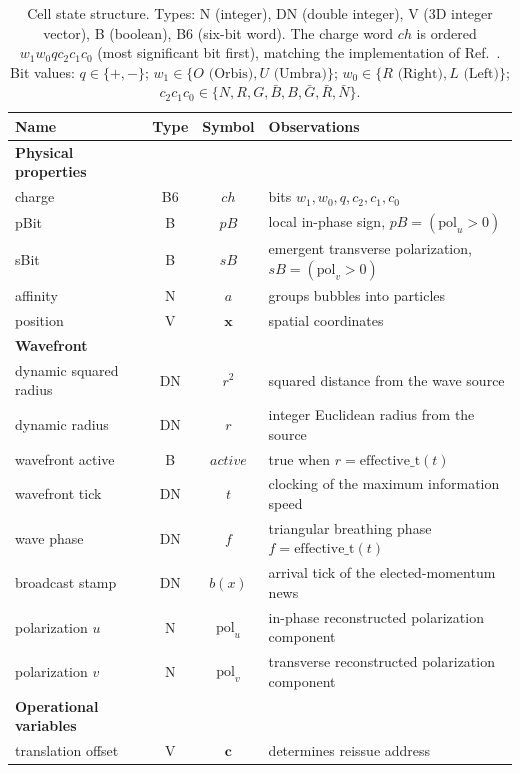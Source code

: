 \documentclass{ijuc}
\renewcommand{\arraystretch}{1.5}
\begin{document}
\begin{table}[htbp]
\centering
\caption{Cell state structure. Types: N (integer), DN (double integer), V (3D integer vector), B (boolean), B6 (six-bit word). The charge word $ch$ is ordered $w_1 w_0 q c_2 c_1 c_0$ (most significant bit first), matching the implementation of Ref.~\cite{af_neto}. Bit values: $q \in \{+, -\}$; $w_1 \in \{O \text{ (Orbis)}, U \text{ (Umbra)}\}$; $w_0 \in \{R \text{ (Right)}, L \text{ (Left)}\}$; $c_2 c_1 c_0 \in \{N, R, G, \bar{B}, B, \bar{G}, \bar{R}, \bar{N}\}$.}
\label{tab:Cell-structure}
\renewcommand{\arraystretch}{1.2}
\begin{tabular}{|l|c|c|l|}
\hline
\textbf{Name} & \textbf{Type} & \textbf{Symbol} & \textbf{Observations} \\
\hline
\textbf{Physical properties} & & & \\
\hline
charge & B6 & $ch$ & bits $w_1, w_0, q, c_2, c_1, c_0$ \\
pBit & B & $pB$ & local in-phase sign, $pB = (\mathrm{pol}_u > 0)$ \\
sBit & B & $sB$ & emergent transverse polarization, $sB = (\mathrm{pol}_v > 0)$ \\
affinity & N & $a$ & groups bubbles into particles \\
position & V & $\boldsymbol{x}$ & spatial coordinates \\
\hline
\textbf{Wavefront} & & & \\
\hline
dynamic squared radius & DN & $r^2$ & squared distance from the wave source \\
dynamic radius & DN & $r$ & integer Euclidean radius from the source \\
wavefront active & B & $\mathit{active}$ & true when $r = \mathrm{effective\_t}(t)$ \\
wavefront tick & DN & $t$ & clocking of the maximum information speed \\
wave phase & DN & $f$ & triangular breathing phase $f = \mathrm{effective\_t}(t)$ \\
broadcast stamp & DN & $b(x)$ & arrival tick of the elected-momentum news \\
polarization $u$ & N & $\mathrm{pol}_u$ & in-phase reconstructed polarization component \\
polarization $v$ & N & $\mathrm{pol}_v$ & transverse reconstructed polarization component \\
\hline
\textbf{Operational variables} & & & \\
\hline
translation offset & V & $\mathbf{c}$ & determines reissue address \\

\end{tabular}
\end{table}
\end{document}
